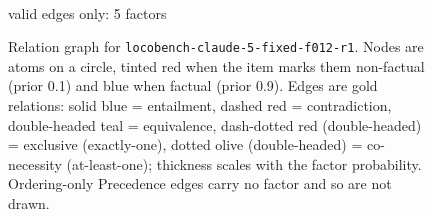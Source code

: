 \documentclass[11pt]{article}
\begin{document}
\begin{figure}[htbp]
\begin{minipage}[t]{0.48\linewidth}
{
}
\\[2pt]{\footnotesize valid edges only: 5 factors}
\end{minipage}
\caption{Relation graph for \texttt{locobench-claude-5-fixed-f012-r1}. Nodes are atoms on a circle, tinted red when the item marks them non-factual (prior 0.1) and blue when factual (prior 0.9). Edges are gold relations: solid blue = entailment, dashed red = contradiction, double-headed teal = equivalence, dash-dotted red (double-headed) = exclusive (exactly-one), dotted olive (double-headed) = co-necessity (at-least-one); thickness scales with the factor probability. Ordering-only Precedence edges carry no factor and so are not drawn.}
\label{fig:graph-locobench-claude-5-fixed-f012-r1}
\end{figure}
\end{document}
